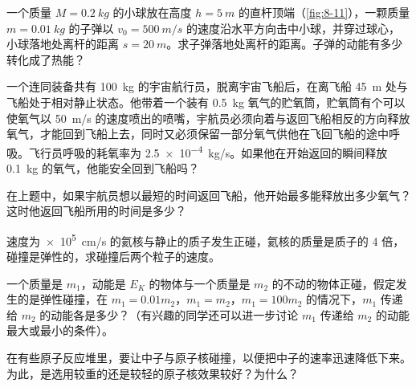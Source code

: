 \begin{Exercise}
\begin{question}
\begin{figurehere}
\begin{minipage}{\linewidth}
    \caption{}\label{fig:8-11}
  \end{minipage}
\end{figurehere}
  \item 一个质量 $M=\qty{0.2}{kg}$ 的小球放在高度 $h=\qty{5}{m}$ 的直杆顶端（\cref{fig:8-11}），一颗质量 $m=\qty{0.01}{kg}$ 的子弹以 $v_0=\qty{500}{m/s}$ 的速度沿水平方向击中小球，并穿过球心，小球落地处离杆的距离 $s=\qty{20}{m}$。求子弹落地处离杆的距离。子弹的动能有多少转化成了热能？
   \item 一个连同装备共有 \qty{100}{kg} 的宇宙航行员，脱离宇宙飞船后，在离飞船 \qty{45}{m} 处与飞船处于相对静止状态。他带着一个装有 \qty{0.5}{kg} 氧气的贮氧筒，贮氧筒有个可以使氧气以 \qty{50}{m/s} 的速度喷出的喷嘴，宇航员必须向着与返回飞船相反的方向释放氧气，才能回到飞船上去，同时又必须保留一部分氧气供他在飞回飞船的途中呼吸。飞行员呼吸的耗氧率为 \qty{2.5e-4}{kg/s}。如果他在开始返回的瞬间释放 \qty{0.1}{kg} 的氧气，他能安全回到飞船吗？





\item 在上题中，如果宇航员想以最短的时间返回飞船，他开始最多能释放出多少氧气？这时他返回飞船所用的时间是多少？
\item 速度为\qty{e5}{cm/s} 的氦核与静止的质子发生正碰，氦核的质量是质子的 4 倍，碰撞是弹性的，求碰撞后两个粒子的速度。
\item 一个质量是 $m_1$，动能是 $E_K$ 的物体与一个质量是 $m_2$ 的不动的物体正碰，假定发生的是弹性碰撞，在 $m_1=0.01m_2$，$m_1=m_2$，$m_1=100m_2$ 的情况下，$m_1$ 传递给 $m_2$ 的动能各是多少？（有兴趣的同学还可以进一步讨论 $m_1$ 传递给 $m_2$ 的动能最大或最小的条件）。

  \item 在有些原子反应堆里，要让中子与原子核碰撞，以便把中子的速率迅速降低下来。为此，是选用较重的还是较轻的原子核效果较好？为什么？
\end{question}
\end{Exercise}